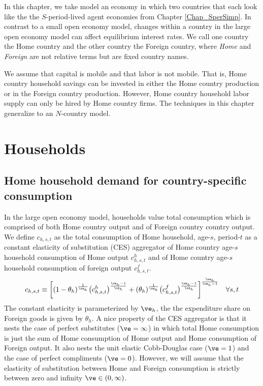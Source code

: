 
In this chapter, we take model an economy in which two countries that each look like the the $S$-period-lived agent economies from Chapter \ref{Chap_SperSimp}. In contrast to a small open economy model, changes within a country in the large open economy model can affect equilibrium interest rates. We call one country the Home country and the other country the Foreign country, where \textit{Home} and \textit{Foreign} are not relative terms but are fixed country names.

We assume that capital is mobile and that labor is not mobile. That is, Home country household savings can be invested in either the Home country production or in the Foreign country production. However, Home country household labor supply can only be hired by Home country firms. The techniques in this chapter generalize to an $N$-country model.


\section{Households}\label{SecLgOpenHH}


  \subsection{Home household demand for country-specific consumption}\label{SecLgOpenHHhomeSpec}

    In the large open economy model, households value total consumption which is comprised of both Home country output and of Foreign country country output. We define $c_{h,s,t}$ as the total consumption of Home household, age-$s$, period-$t$ as a constant elasticity of substitution (CES) aggregator of Home country age-$s$ household consumption of Home output $c^h_{h,s,t}$ and of Home country age-$s$ household consumption of foreign output $c^f_{h,s,t}$.
    \begin{equation}\label{EqLgOpenHHchCES}
      c_{h,s,t}\equiv \biggl[(1 - \theta_h)^\frac{1}{\ve_h}\bigl(c^h_{h,s,t}\bigr)^\frac{\ve_h-1}{\ve_h} + (\theta_h)^\frac{1}{\ve_h}\bigl(c^f_{h,s,t}\bigr)^\frac{\ve_h-1}{\ve_h}\biggr]^\frac{\ve_h}{\ve_h-1} \quad\forall s,t
    \end{equation}
    The constant elasticity is parameterized by $\ve_h$, the the expenditure share on Foreign goods is given by $\theta_h$. A nice property of the CES aggregator is that it nests the case of perfect substitutes ($\ve=\infty$) in which total Home consumption is just the sum of Home consumption of Home output and Home consumption of Foreign output. It also nests the unit elastic Cobb-Douglas case ($\ve=1$) and the case of perfect compliments ($\ve=0$). However, we will assume that the elasticity of substitution between Home and Foreign consumption is strictly between zero and infinity $\ve\in(0,\infty)$.


